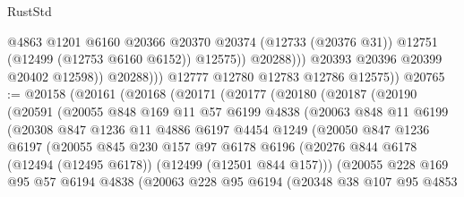 \begin{lexlean}{RustStd}
\begin{coremodule}
{\begin{coremodule}
{{{{{{{{{{{{{{{{{{{{{{{{{{{{{{{{{{{{{{{{{{{{{{{{{{{{{{{{{{{{{{{{{{{{{{{{{{{{{{{{                            @4863
                            @1201
                            @6160
                            @20366
                            @20370
                            @20374
                            (@12733 (@20376 @31))
                            @12751
                            (@12499 (@12753 @6160 @6152))
                            @12575))
                        @20288)))
                  @20393
                  @20396
                  @20399
                  @20402
                  @12598))
              @20288)))
        @12777
        @12780
        @12783
        @12786
        @12575))
@20765 := @20158
    (@20161
      (@20168
        (@20171
          (@20177
            (@20180
              (@20187
                (@20190
                  (@20591
                    (@20055
                      @848
                      @169
                      @11
                      @57
                      @6199
                      @4838
                      (@20063
                        @848
                        @11
                        @6199
                        (@20308
                          @847
                          @1236
                          @11
                          @4886
                          @6197
                          @4454
                          @1249
                          (@20050
                            @847
                            @1236
                            @6197
                            (@20055
                              @845
                              @230
                              @157
                              @97
                              @6178
                              @6196
                              (@20276
                                @844
                                @6178
                                (@12494 (@12495 @6178))
                                (@12499 (@12501 @844 @157)))
                              (@20055
                                @228
                                @169
                                @95
                                @57
                                @6194
                                @4838
                                (@20063
                                  @228
                                  @95
                                  @6194
                                  (@20348
                                    @38
                                    @107
                                    @95
                                    @4853
}}}}}}}}}}}}}}}}}}}}}}}}}}}}}}}}}}}}}}}}}}}}}}}}}}}}}}}}}}}}}}}}}}}}}}}}}}}}}}}}
\end{coremodule}}
\end{coremodule}
\end{lexlean}
